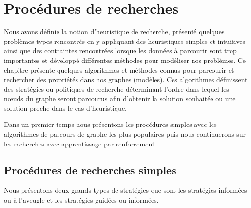 \chapter{Procédures de recherches}

\label{Chapter2} %

Nous avons définie la notion d'heuristique de recherche, présenté quelques problèmes types rencontrés en y appliquant des heuristiques simples et intuitives ainsi que des contraintes rencontrées lorsque les données à parcourir sont trop importantes et développé différentes méthodes pour modéliser nos problèmes. 
Ce chapitre présente quelques algorithmes et méthodes connus pour parcourir et rechercher des propriétés dans nos graphes (modèles).
Ces algorithmes définissent des stratégies ou politiques de recherche déterminant l'ordre dans lequel les nœuds du graphe seront parcourus afin d'obtenir la solution souhaitée ou une solution proche dans le cas d'heuristique.

Dans un premier temps nous présentons les procédures simples avec les algorithmes de parcours de graphe les plus populaires puis nous continuerons sur les recherches avec apprentissage par renforcement.


\section{Procédures de recherches simples}
Nous présentons deux grands types de stratégies que sont les stratégies informées ou à l'aveugle et les stratégies guidées ou informées.


